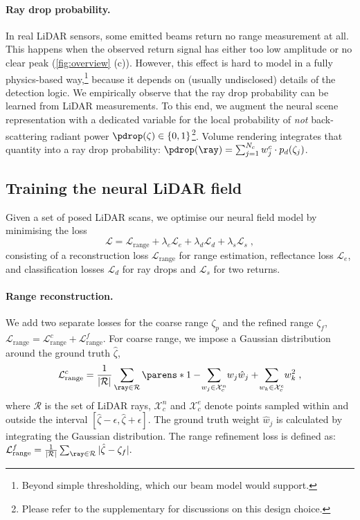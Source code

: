 \paragraph{Ray drop probability.}
In real LiDAR sensors, some emitted beams return no range measurement at all. This happens when the observed return signal has either too low amplitude or no clear peak (\cref{fig:overview} (c)). However, this effect is hard to model in a fully physics-based way,\footnote{Beyond simple thresholding, which our beam model would support.} because it depends on (usually undisclosed) details of the detection logic. We empirically observe that the ray drop probability can be learned from LiDAR measurements. To this end, we augment the neural scene representation with a dedicated variable for the local probability of \textit{not} back-scattering radiant power $\pdrop(\zeta) \in \{0, 1\}$\footnote{Please refer to the supplementary for discussions on this design choice.}. 
Volume rendering integrates that quantity into a ray drop probability: $\pdrop(\ray) = \sum_{j=1}^{N_c} w_j^c\cdot p_d(\zeta_j)$.


\subsection{Training the neural LiDAR field}
\label{sec:opt}
Given a set of posed LiDAR scans, we optimise our neural field model by minimising the loss
\begin{equation}
    \mathcal{L} = \mathcal{L}_{\text{range}} + \lambda_e \mathcal{L}_{e} + \lambda_d \mathcal{L}_{d} + \lambda_s\mathcal{L}_s\;,
\label{eq:loss}
\end{equation}
consisting of a reconstruction loss $\mathcal{L}_{\text{range}}$ for range estimation, reflectance loss $\mathcal{L}_{e}$, and classification losses $\mathcal{L}_{d}$ for ray drops and $\mathcal{L}_s$ for two returns. 


\paragraph{Range reconstruction.}
We add two separate losses for the coarse range $\zeta_p$ and the refined range $\zeta_f$, $\mathcal{L}_{\text{range}} = \mathcal{L}_{\text{range}}^c + \mathcal{L}_{\text{range}}^f$. For coarse range, we impose a Gaussian distribution~\cite{rematas2021urban} around the ground truth $\hat{\zeta}$, 
\begin{equation}
    \mathcal{L}_{\text{range}}^c = \frac{1}{|\mathcal{R}|} \sum_{\ray \in \mathcal{R}} \parens*{1-\!\sum_{w_j \in \mathcal{X}_c^n}\!w_j \hat{w}_j+\!\sum_{w_k \in \mathcal{X}_c^e}\!w_k^2}\;,
\end{equation}
where $\mathcal{R}$ is the set of LiDAR rays, $\mathcal{X}_c^n$ and $\mathcal{X}_c^e$ denote points sampled within and outside the interval $[\hat{\zeta}-\epsilon,\hat{\zeta}+\epsilon]$. The ground truth weight $\hat{w}_j$ is calculated by integrating the Gaussian distribution.
The range refinement loss is defined as: $\mathcal{L}_{\text{range}}^f = \frac{1}{|\mathcal{R}|} \sum_{\ray \in \mathcal{R}} |\hat{\zeta} - \zeta_f|.$


